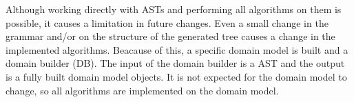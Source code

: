 Although working directly with ASTs and performing all algorithms on them is possible, it causes 
a limitation in future changes. Even a small change in the grammar and/or on the structure of the
generated tree causes a change in the implemented algorithms. Beacause of this, a specific domain
model is built and a domain builder (DB). The input of the domain builder is a AST and the output is 
a fully built domain model objects. It is not expected for the domain model to change, so all 
algorithms are implemented on the domain model. 
